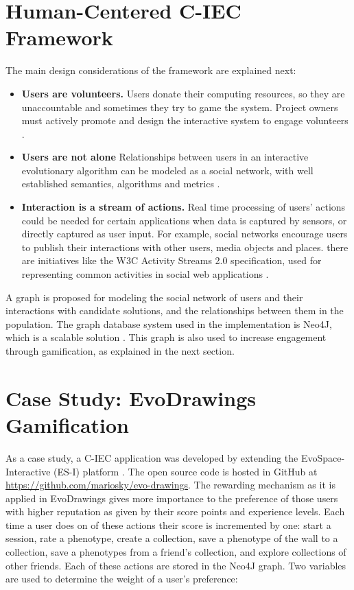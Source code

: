 \section{Human-Centered C-IEC Framework}
\label{sec:framework} 
The main design considerations of the framework are explained next: 
\begin{itemize}
\item {\bf Users are volunteers.} Users donate their computing resources, so they are 
unaccountable and sometimes they try to game the system. Project owners must actively promote and
design the interactive system to engage volunteers \cite{oh2015clicking}. %
\item {\bf Users are not alone}
  Relationships between users in an interactive evolutionary algorithm can be modeled
  as a social network, with well established semantics, algorithms and metrics 
  \cite{ahuja1993network}. 
\item {\bf Interaction is a stream of actions.}
  Real time processing of users' actions could be needed for certain applications when data is 
  captured by sensors, or directly captured as user input. For example, social networks encourage
  users to publish their interactions with other users, media objects and places.
  there are initiatives like the W3C Activity Streams 2.0  specification, used for 
  representing common activities in social web applications \cite{json:streams}. 
\end{itemize}

A graph is proposed for modeling the social network of users and their interactions 
with candidate solutions, and the relationships between them in the population.
The graph database system used in the implementation is Neo4J, which is a scalable solution 
\cite{miller2013graph,holzschuher2013performance}. 
This graph is also used to increase engagement through gamification, as explained in the next section.


\section{Case Study: EvoDrawings Gamification}
\label{sec:evodraw}
As a case study, a C-IEC application was developed by extending the 
EvoSpace-Interactive (ES-I) platform \cite{garcia2013evospace}. 
The open source code is hosted in GitHub at
\url{https://github.com/mariosky/evo-drawings}. The rewarding 
mechanism as it is applied in EvoDrawings gives more importance 
to the preference of those users with higher reputation
as given by their score points and experience levels.  
Each time a user does on of these actions their score is incremented by one:
start a session, rate a phenotype, create a collection, save a phenotype of 
the wall to a collection, save a phenotypes from a friend's collection, and
explore collections of other friends. Each of these actions are stored in
the Neo4J graph. Two variables are used to determine the weight of a user's 
preference:

